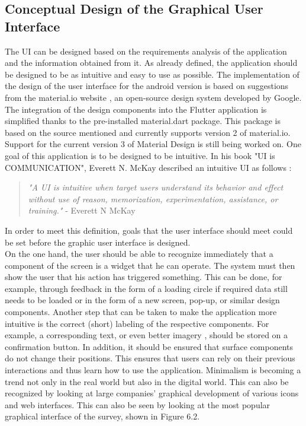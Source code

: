 \subsection{Conceptual Design of the Graphical User Interface}
The UI can be designed based on the requirements analysis of the application and the information obtained from it. As already defined, the application should be designed to be as intuitive and easy to use as possible. The implementation of the design of the user interface for the android version is based on suggestions from the material.io website \cite{.materialio}, an open-source design system developed by Google. The integration of the design components into the Flutter application is simplified thanks to the pre-installed material.dart package. This package is based on the source mentioned and currently supports version 2 of material.io. Support for the current version 3 of Material Design is still being worked on.
\noindent
One goal of this application is to be designed to be intuitive. In his book "UI is COMMUNICATION", Everett N. McKay described an intuitive UI as follows \cite{.mckay}: 
\begin{quote}
	\textit{"A UI is intuitive when target users understand its behavior and effect without use of reason, memorization, experimentation, assistance, or training."} - Everett N McKay \cite[p. 22]{.mckay}
\end{quote}
In order to meet this definition, goals that the user interface should meet could be set before the graphic user interface is designed.\\
\noindent
On the one hand, the user should be able to recognize immediately that a component of the screen is a widget that he can operate. The system must then show the user that his action has triggered something. This can be done, for example, through feedback in the form of a loading circle if required data still needs to be loaded or in the form of a new screen, pop-up, or similar design components. \cite{.mckay} Another step that can be taken to make the application more intuitive is the correct (short) labeling of the respective components. For example, a corresponding text, or even better imagery \cite[p. 172]{.essui}, should be stored on a confirmation button. In addition, it should be ensured that surface components do not change their positions. This ensures that users can rely on their previous interactions and thus learn how to use the application. Minimalism is becoming a trend not only in the real world but also in the digital world. This can also be recognized by looking at large companies' graphical development of various icons and web interfaces. This can also be seen by looking at the most popular graphical interface of the survey, shown in Figure 6.2.

